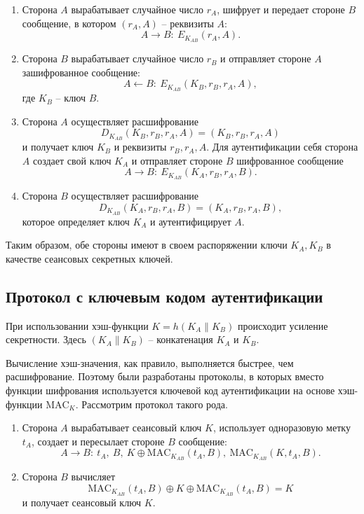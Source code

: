 \documentclass[10pt,a4paper]{book}
\newcommand{\MAC}{\textrm{MAC}}
\begin{document}
\begin{enumerate}
    \item Сторона $A$ вырабатывает случайное число $r_A$, шифрует и передает стороне $B$ сообщение, в котором  $(r_A, A)$ -- реквизиты $A$:
            \[ A \rightarrow B: ~ E_{K_{AB}}(r_A, A). \]
    \item Сторона $B$ вырабатывает случайное число $r_B$ и отправляет стороне $A$ зашифрованное сообщение:
            \[ A \leftarrow B: ~ E_{K_{AB}}(K_B, r_B, r_A, A), \]
        где $K_B$ -- ключ $B$.
     \item Сторона $A$ осуществляет расшифрование
            \[ D_{K_{AB}}(K_B, r_B, r_A, A) = (K_B, r_B, r_A, A) \]
        и получает ключ $K_B$ и реквизиты $r_B, r_A, A$. Для аутентификации себя сторона $A$ создает свой ключ $K_A$ и отправляет стороне $B$ шифрованное сообщение
            \[ A \rightarrow B: ~ E_{K_{AB}}(K_A, r_B, r_A, B). \]
     \item Сторона $B$ осуществляет расшифрование
            \[ D_{K_{AB}}(K_A, r_B, r_A, B) = (K_A, r_B, r_A, B), \]
        которое определяет ключ $K_A$ и аутентифицирует $A$.
\end{enumerate}

Таким образом, обе стороны имеют в своем распоряжении ключи $K_A, K_B$ в качестве сеансовых секретных ключей.


\subsection{Протокол с ключевым кодом аутентификации}

При использовании хэш-функции $K = h(K_{A} \| K_{B})$ происходит усиление секретности. Здесь $(K_{A} \| K_{B})$ -- конкатенация $K_{A} $ и $K_{B}$.


Вычисление хэш-значения, как правило, выполняется быстрее, чем расшифрование. Поэтому были разработаны протоколы, в которых вместо функции шифрования используется ключевой код аутентификации на основе хэш-функции $\MAC_K$. Рассмотрим протокол такого рода.
\begin{enumerate}
    \item  Сторона $A$ вырабатывает сеансовый ключ $K$, использует одноразовую метку $t_{A}$, создает и пересылает стороне $B$ сообщение:
            \[ A \rightarrow B: ~ t_A, ~ B, ~ K \oplus \MAC_{K_{AB}}( t_A, B), ~ \MAC_{K_{AB}}(K, t_A, B). \]
    \item  Сторона $B$ вычисляет
            \[ \MAC_{K_{AB}}(t_A, B) \oplus K \oplus \MAC_{K_{AB}}(t_A, B) = K \]
        и получает сеансовый ключ $K$.
\end{enumerate}
\end{document}
